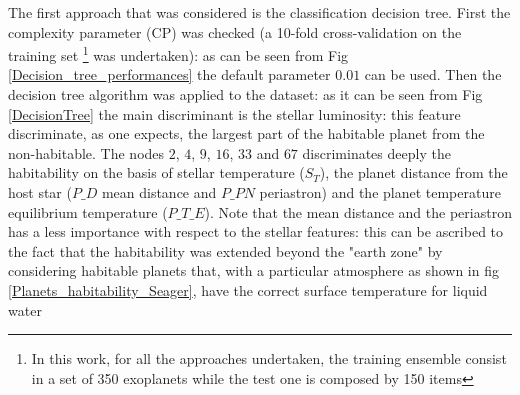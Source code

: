 \documentclass[
12pt, %
a4paper, %
oneside, %
headinclude,footinclude, %
BCOR5mm, %
]{scrartcl}
\begin{document}
The first approach that was considered is the classification decision tree. First the complexity parameter (CP) was checked (a 10-fold cross-validation on the training set \footnote{In this work, for all the approaches undertaken, the training ensemble consist in a set of 350 exoplanets while the test one is composed by 150 items} was undertaken): as can be seen from Fig \ref{Decision_tree_performances} the default parameter $0.01$ can be used. Then the decision tree algorithm was applied to the dataset: as it can be seen from Fig \ref{DecisionTree} the main discriminant is the stellar luminosity: this feature discriminate, as one expects, the largest part of the habitable planet from the non-habitable. The nodes $2$, $4$, $9$, $16$, $33$ and $67$ discriminates deeply the habitability on the basis of stellar temperature ($S_T$), the planet distance from the host star ($P\_D$ mean distance and $P\_PN$ periastron) and the planet temperature equilibrium temperature ($P\_T\_E$). Note that the mean distance and the periastron has a less importance with respect to the stellar features: this can be ascribed to the fact that the habitability was extended beyond the "earth zone" by considering habitable planets that, with a particular atmosphere as shown in fig \ref{Planets_habitability_Seager}, have the correct surface temperature for liquid water
\end{document}
